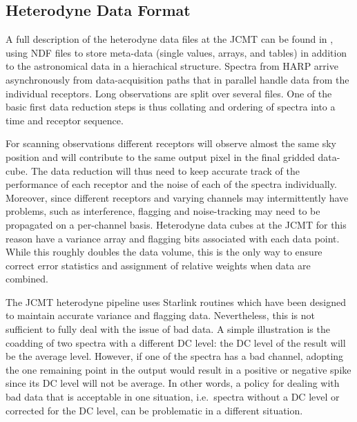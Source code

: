 \documentclass[final,authoryear,5p,times,twocolumn]{elsarticle}
\begin{document}
\subsection{Heterodyne Data Format}
\label{sec:format}

A full description of the heterodyne data files at the JCMT can be
found in \citet{OCS_ICD_022}, using NDF
\citep{NDF,1988STARB...2...11C,P91_adassxxiii} files to store
meta-data (single values, arrays, and tables) in addition to the astronomical
data in a hierachical structure. Spectra from HARP arrive
asynchronously from data-acquisition paths that in parallel handle
data from the individual receptors. Long observations are split
over several files. One of the basic first data reduction steps is thus
collating and ordering of spectra into a time and receptor sequence.

For scanning observations different receptors will observe almost
the same sky position and will contribute to the same output pixel in
the final gridded data-cube. The data reduction will thus need to keep
accurate track of the performance of each receptor and the noise of
each of the spectra individually. Moreover, since different receptors
and varying channels may intermittently have problems, such as
interference, flagging and noise-tracking may need to be propagated on a
per-channel basis. Heterodyne data cubes at the JCMT for this reason
have a variance array and flagging bits associated with each data point.
While this roughly doubles the data volume, this is the only way to
ensure correct error statistics and assignment of relative weights
when data are combined.

The JCMT heterodyne pipeline uses Starlink \citep[see
e.g.][]{2013ASPC..475..247B} routines which
have been designed to maintain accurate variance and flagging data.
Nevertheless, this is not sufficient to fully deal with the issue of
bad data. A simple illustration is the coadding of two spectra with a
different DC level: the DC level of the result will be the average
level. However, if one of the spectra has a bad channel, adopting the
one remaining point in the output would result in a positive or
negative spike since its DC level will not be average. In other words,
a policy for dealing with bad data that is acceptable in one situation,
i.e.\ spectra without a DC level or corrected for the DC level, can be
problematic in a different situation.
\end{document}
